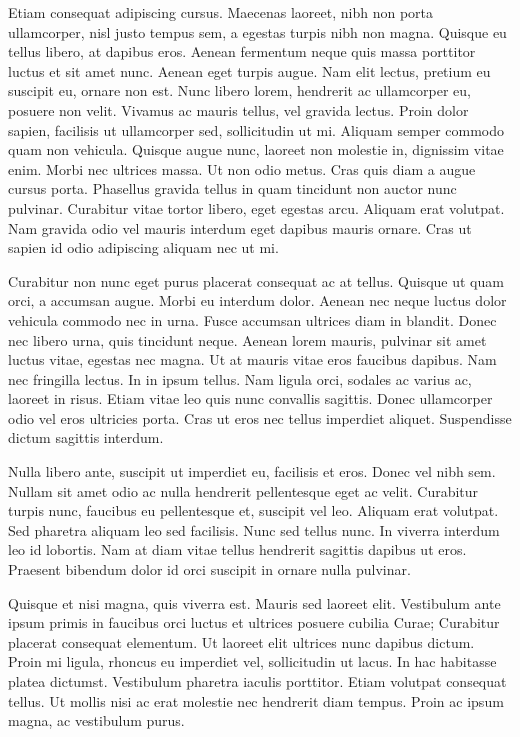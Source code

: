 Etiam consequat adipiscing cursus.
Maecenas laoreet, nibh non porta ullamcorper, nisl justo tempus sem, a egestas turpis nibh non magna.
Quisque eu tellus libero, at dapibus eros.
Aenean fermentum neque quis massa porttitor luctus et sit amet nunc.
Aenean eget turpis augue.
Nam elit lectus, pretium eu suscipit eu, ornare non est.
Nunc libero lorem, hendrerit ac ullamcorper eu, posuere non velit.
Vivamus ac mauris tellus, vel gravida lectus.
Proin dolor sapien, facilisis ut ullamcorper sed, sollicitudin ut mi.
Aliquam semper commodo quam non vehicula.
Quisque augue nunc, laoreet non molestie in, dignissim vitae enim.
Morbi nec ultrices massa.
Ut non odio metus.
Cras quis diam a augue cursus porta.
Phasellus gravida tellus in quam tincidunt non auctor nunc pulvinar.
Curabitur vitae tortor libero, eget egestas arcu.
Aliquam erat volutpat.
Nam gravida odio vel mauris interdum eget dapibus mauris ornare.
Cras ut sapien id odio adipiscing aliquam nec ut mi.

Curabitur non nunc eget purus placerat consequat ac at tellus.
Quisque ut quam orci, a accumsan augue.
Morbi eu interdum dolor.
Aenean nec neque luctus dolor vehicula commodo nec in urna.
Fusce accumsan ultrices diam in blandit.
Donec nec libero urna, quis tincidunt neque.
Aenean lorem mauris, pulvinar sit amet luctus vitae, egestas nec magna.
Ut at mauris vitae eros faucibus dapibus.
Nam nec fringilla lectus.
In in ipsum tellus.
Nam ligula orci, sodales ac varius ac, laoreet in risus.
Etiam vitae leo quis nunc convallis sagittis.
Donec ullamcorper odio vel eros ultricies porta.
Cras ut eros nec tellus imperdiet aliquet.
Suspendisse dictum sagittis interdum.

Nulla libero ante, suscipit ut imperdiet eu, facilisis et eros.
Donec vel nibh sem.
Nullam sit amet odio ac nulla hendrerit pellentesque eget ac velit.
Curabitur turpis nunc, faucibus eu pellentesque et, suscipit vel leo.
Aliquam erat volutpat.
Sed pharetra aliquam leo sed facilisis.
Nunc sed tellus nunc.
In viverra interdum leo id lobortis.
Nam at diam vitae tellus hendrerit sagittis dapibus ut eros.
Praesent bibendum dolor id orci suscipit in ornare nulla pulvinar.

Quisque et nisi magna, quis viverra est.
Mauris sed laoreet elit.
Vestibulum ante ipsum primis in faucibus orci luctus et ultrices posuere cubilia Curae; Curabitur placerat consequat elementum.
Ut laoreet elit ultrices nunc dapibus dictum.
Proin mi ligula, rhoncus eu imperdiet vel, sollicitudin ut lacus.
In hac habitasse platea dictumst.
Vestibulum pharetra iaculis porttitor.
Etiam volutpat consequat tellus.
Ut mollis nisi ac erat molestie nec hendrerit diam tempus.
Proin ac ipsum magna, ac vestibulum purus.

